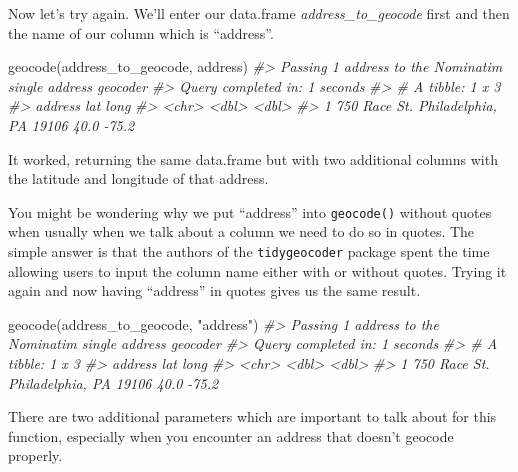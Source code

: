 \documentclass[
]{krantz}
\makeatletter
\newenvironment{Shaded}{\begin{snugshade}}{\end{snugshade}}
\newcommand{\CommentTok}[1]{\textcolor[rgb]{0.37,0.37,0.37}{\textit{#1}}}
\newcommand{\FunctionTok}[1]{\textcolor[rgb]{0,0,0}{#1}}
\newcommand{\NormalTok}[1]{#1}
\newcommand{\StringTok}[1]{\textcolor[rgb]{0.5,0.5,0.5}{#1}}
\newenvironment{kframe}{%
\medskip{}
\setlength{\fboxsep}{.8em}
 \def\at@end@of@kframe{}%
 \ifinner\ifhmode%
  \def\at@end@of@kframe{\end{minipage}}%
  \begin{minipage}{\columnwidth}%
 \fi\fi%
 \def\FrameCommand##1{\hskip\@totalleftmargin \hskip-\fboxsep
 \colorbox{shadecolor}{##1}\hskip-\fboxsep
     \hskip-\linewidth \hskip-\@totalleftmargin \hskip\columnwidth}%
 \MakeFramed {\advance\hsize-\width
   \@totalleftmargin\z@ \linewidth\hsize
   \@setminipage}}%
 {\par\unskip\endMakeFramed%
 \at@end@of@kframe}
\renewenvironment{Shaded}{\begin{kframe}}{\end{kframe}}
\makeatother
\begin{document}
Now let's try again. We'll enter our data.frame
\emph{address\_to\_geocode} first and then the name of our
column which is ``address''.

\begin{Shaded}
\begin{Highlighting}[]
\FunctionTok{geocode}\NormalTok{(address\_to\_geocode, address)}
\CommentTok{\#\textgreater{} Passing 1 address to the Nominatim single address geocoder}
\CommentTok{\#\textgreater{} Query completed in: 1 seconds}
\CommentTok{\#\textgreater{} \# A tibble: 1 x 3}
\CommentTok{\#\textgreater{}   address                               lat  long}
\CommentTok{\#\textgreater{}   \textless{}chr\textgreater{}                               \textless{}dbl\textgreater{} \textless{}dbl\textgreater{}}
\CommentTok{\#\textgreater{} 1 750 Race St. Philadelphia, PA 19106  40.0 {-}75.2}
\end{Highlighting}
\end{Shaded}

It worked, returning the same data.frame but with two
additional columns with the latitude and longitude of that
address.

You might be wondering why we put ``address'' into
\texttt{geocode()} without quotes when usually when we talk
about a column we need to do so in quotes. The simple answer
is that the authors of the \texttt{tidygeocoder} package
spent the time allowing users to input the column name
either with or without quotes. Trying it again and now
having ``address'' in quotes gives us the same result.

\begin{Shaded}
\begin{Highlighting}[]
\FunctionTok{geocode}\NormalTok{(address\_to\_geocode, }\StringTok{"address"}\NormalTok{)}
\CommentTok{\#\textgreater{} Passing 1 address to the Nominatim single address geocoder}
\CommentTok{\#\textgreater{} Query completed in: 1 seconds}
\CommentTok{\#\textgreater{} \# A tibble: 1 x 3}
\CommentTok{\#\textgreater{}   address                               lat  long}
\CommentTok{\#\textgreater{}   \textless{}chr\textgreater{}                               \textless{}dbl\textgreater{} \textless{}dbl\textgreater{}}
\CommentTok{\#\textgreater{} 1 750 Race St. Philadelphia, PA 19106  40.0 {-}75.2}
\end{Highlighting}
\end{Shaded}

There are two additional parameters which are important to
talk about for this function, especially when you encounter
an address that doesn't geocode properly.
\end{document}

